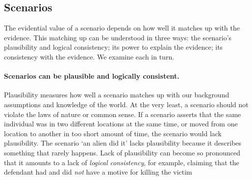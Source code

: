 \documentclass[10pt]{article}
\begin{document}

\subsection{Scenarios}

The evidential value of a scenario depends on how well it matches up with the evidence. 
This matching up can be understood in three ways: the scenario's plausibility and logical consistency; its power to explain the evidence; 
its consistency with the evidence. We examine each in turn. 


\paragraph{Scenarios can be plausible and logically consistent.}

Plausibility measures how well a scenario matches up with 
our background assumptions and knowledge of the world. %
At the very least, a scenario should not violate the laws of nature or common sense. If a scenario asserts that the same individual was in two different locations 
at the same time, or moved from one location to another in too short amount of time, the scenario would lack plausibility. 
The scenario `an alien did it' lacks plausibility because it describes something that rarely happens. 
Lack of plausibility can become so pronounced that it amounts to a lack of \textit{logical consistency}, for example, claiming that 
 the defendant had and did \textit{not} have a motive for killing the victim
 
\end{document}
